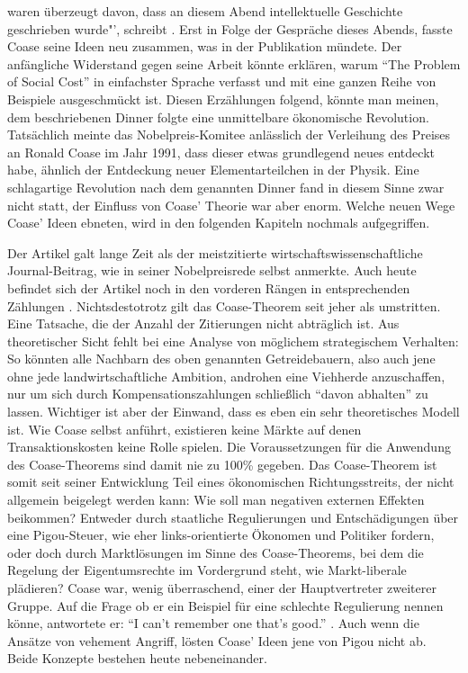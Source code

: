 waren überzeugt davon, dass an diesem Abend intellektuelle Geschichte geschrieben wurde"', schreibt \parencite[S. 115]{Warsh}. Erst in Folge der Gespräche dieses Abends, fasste Coase seine Ideen neu zusammen, was in der Publikation \textcite{Coase1960} mündete. Der anfängliche Widerstand gegen seine Arbeit könnte erklären, warum "`The Problem of Social Cost"' in einfachster Sprache verfasst und mit eine ganzen Reihe von Beispiele ausgeschmückt ist. Diesen Erzählungen folgend, könnte man meinen, dem beschriebenen Dinner folgte eine unmittelbare ökonomische Revolution. Tatsächlich meinte das Nobelpreis-Komitee anlässlich der Verleihung des Preises an Ronald Coase im Jahr 1991, dass dieser etwas grundlegend neues entdeckt habe, ähnlich der Entdeckung neuer Elementarteilchen in der Physik. Eine schlagartige Revolution nach dem genannten Dinner fand in diesem Sinne zwar nicht statt, der Einfluss von Coase' Theorie war aber enorm. Welche neuen Wege Coase' Ideen ebneten, wird in den folgenden Kapiteln nochmals aufgegriffen.

Der Artikel \textcite{Coase1960} galt lange Zeit als der meistzitierte wirtschaftswissenschaftliche Journal-Beitrag, wie \textcite{Coase1991a} in seiner Nobelpreisrede selbst anmerkte. Auch heute befindet sich der Artikel noch in den vorderen Rängen in entsprechenden Zählungen \parencite[S. 400]{Mergio2016}. Nichtsdestotrotz gilt das Coase-Theorem seit jeher als umstritten. Eine Tatsache, die der Anzahl der Zitierungen nicht abträglich ist. Aus theoretischer Sicht fehlt bei \textcite{Coase1960} eine Analyse von möglichem strategischem Verhalten: So könnten alle Nachbarn des oben genannten Getreidebauern, also auch jene ohne jede landwirtschaftliche Ambition, androhen eine Viehherde anzuschaffen, nur um sich durch Kompensationszahlungen schließlich "`davon abhalten"' zu lassen. Wichtiger ist aber der Einwand, dass es eben ein sehr theoretisches Modell ist. Wie Coase selbst anführt, existieren keine Märkte auf denen Transaktionskosten keine Rolle spielen. Die Voraussetzungen für die Anwendung des Coase-Theorems sind damit nie zu 100\% gegeben. Das Coase-Theorem ist somit seit seiner Entwicklung Teil eines ökonomischen Richtungsstreits, der nicht allgemein beigelegt werden kann: Wie soll man negativen externen Effekten beikommen? Entweder durch staatliche Regulierungen und Entschädigungen über eine Pigou-Steuer, wie eher links-orientierte Ökonomen und Politiker fordern, oder doch durch Marktlösungen im Sinne des Coase-Theorems, bei dem die Regelung der Eigentumsrechte im Vordergrund steht, wie Markt-liberale plädieren? Coase war, wenig überraschend, einer der Hauptvertreter zweiterer Gruppe. Auf die Frage ob er ein Beispiel für eine schlechte Regulierung nennen könne, antwortete er: "`I can't remember one that's good."' \parencite[S. 45]{Schlafly2007}. Auch wenn \textcite{Coase1960} die Ansätze von \textcite{Pigou1920} vehement Angriff, lösten Coase' Ideen jene von Pigou nicht ab. Beide Konzepte bestehen heute nebeneinander.

